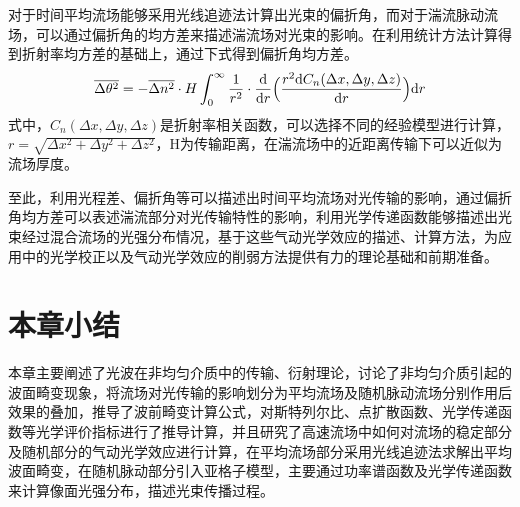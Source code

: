 对于时间平均流场能够采用光线追迹法计算出光束的偏折角，而对于湍流脉动流场，可以通过偏折角的均方差来描述湍流场对光束的影响。在利用统计方法计算得到折射率均方差的基础上，通过下式得到偏折角均方差。
\begin{equation}
\overline{\Delta\theta^2}=-\overline{\Delta n^2}\cdot H\int_0^\infty\frac{1}{r^2}\cdot\frac{\rm d}{{\rm d}r}\Big(\frac{r^2{\rm d}C_n(\Delta x,\Delta y,\Delta z)}{{\rm d}r}\Big){\rm d}r
\end{equation}
式中，$C_n(\Delta x,\Delta y,\Delta z)$是折射率相关函数，可以选择不同的经验模型进行计算，$r=\sqrt{\Delta x^2+\Delta y^2+\Delta z^2}$，H为传输距离，在湍流场中的近距离传输下可以近似为流场厚度。

至此，利用光程差、偏折角等可以描述出时间平均流场对光传输的影响，通过偏折角均方差可以表述湍流部分对光传输特性的影响，利用光学传递函数能够描述出光束经过混合流场的光强分布情况，基于这些气动光学效应的描述、计算方法，为应用中的光学校正以及气动光学效应的削弱方法提供有力的理论基础和前期准备。
\section{本章小结}
本章主要阐述了光波在非均匀介质中的传输、衍射理论，讨论了非均匀介质引起的波面畸变现象，将流场对光传输的影响划分为平均流场及随机脉动流场分别作用后效果的叠加，推导了波前畸变计算公式，对斯特列尔比、点扩散函数、光学传递函数等光学评价指标进行了推导计算，并且研究了高速流场中如何对流场的稳定部分及随机部分的气动光学效应进行计算，在平均流场部分采用光线追迹法求解出平均波面畸变，在随机脉动部分引入亚格子模型，主要通过功率谱函数及光学传递函数来计算像面光强分布，描述光束传播过程。